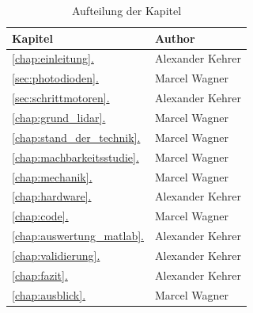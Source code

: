 \setpagestylefoot
\renewcommand{\thefigure}{A\arabic{figure}}
\renewcommand\thelstlisting{A\arabic{lstlisting}}
\renewcommand\thetable{A\arabic{table}}
\newcommand*{\fullref}[1]{\hyperref[{#1}]{\ref*{#1}. \nameref*{#1}}} 


\addchap{\langanhang}



\ifliteratur
    \printbibliography[heading=subbibintoc]
\fi

\ifglossar
    \printglossary[style=altlist,title=\langglossar]
\fi

\newpage
{}
\begin{table}[H]
	\centering
	\caption{Aufteilung der Kapitel}
	\begin{tabular}{|l|l|}
		\hline
		\textbf{Kapitel} & \textbf{Author} \\\hline
		\fullref{chap:einleitung} & Alexander Kehrer \\\hline
		\fullref{sec:photodioden} & Marcel Wagner \\\hline
		\fullref{sec:schrittmotoren} & Alexander Kehrer \\\hline
		\fullref{chap:grund_lidar} & Marcel Wagner \\\hline
		\fullref{chap:stand_der_technik} & Marcel Wagner\\\hline
		\fullref{chap:machbarkeitsstudie} & Marcel Wagner \\\hline
		\fullref{chap:mechanik} & Marcel Wagner \\\hline
		\fullref{chap:hardware} & Alexander Kehrer \\\hline
		\fullref{chap:code} & Marcel Wagner \\\hline
		\fullref{chap:auswertung_matlab} & Alexander Kehrer \\\hline
		\fullref{chap:validierung} & Alexander Kehrer \\\hline
		\fullref{chap:fazit} & Alexander Kehrer \\\hline
		\fullref{chap:ausblick} & Marcel Wagner \\\hline
	\end{tabular}
\end{table}

